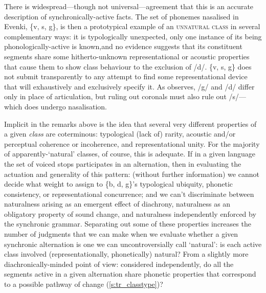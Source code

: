 There is widespread---though not universal---agreement \citep{Blevins2017} that this is an accurate description of synchronically-active facts. The set of phonemes nasalised in Evenki, \{v, s, g\}, is then a prototypical example of an \textsc{unnatural class} in several complementary ways: it is typologically unexpected, only one instance of its being phonologically-active is known,and no evidence suggests that its constituent segments share some hitherto-unknown representational or acoustic properties that cause them to show class behaviour to the exclusion of /d/. \{v, s, g\} does not submit transparently to any attempt to find some representational device that will exhaustively and exclusively specify it. As \cite{Mielke2008} observes, /g/ and /d/ differ only in place of articulation, but ruling out coronals must also rule out /s/---which does undergo nasalisation.


Implicit in the remarks above is the idea that several very different properties of a given \emph{class} are coterminous: typological (lack of) rarity, acoustic and/or perceptual coherence or incoherence, and representational unity. For the majority of apparently-`natural' classes, of course, this is adequate. If in a given language the set of voiced stops participates in an alternation, then in evaluating the actuation and generality of this pattern: (without further information) we cannot decide what weight to assign to \{b, d, g\}'s typological ubiquity, phonetic consistency, or representational concurrence; and we can't discriminate between naturalness arising as an emergent effect of diachrony, naturalness as an obligatory property of sound change, and naturalness independently enforced by the synchronic grammar. Separating out some of these properties increases the number of judgments that we can make when we evaluate whether a given synchronic alternation is one we can uncontroversially call `natural': is each active class involved (representationally, phonetically) natural? From a slightly more diachronically-minded point of view: considered independently, do all the segments active in a given alternation share phonetic properties that correspond to a possible pathway of change (\cref{s:tr_classtype})?


